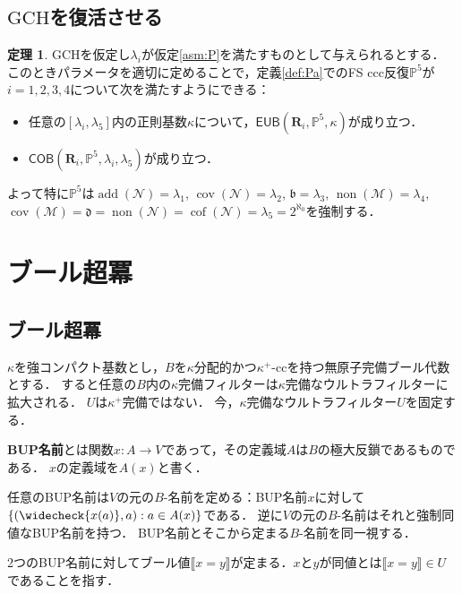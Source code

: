 \documentclass[uplatex,dvipdfmx]{jsarticle}
\newcommand{\non}{\operatorname{non}}
\newcommand{\cov}{\operatorname{cov}}
\newcommand{\add}{\operatorname{add}}
\newcommand{\cof}{\operatorname{cof}}
\newcommand{\GCH}{\mathrm{GCH}}
\newcommand{\EUB}{\mathsf{EUB}}
\newcommand{\COB}{\mathsf{COB}}
\newcommand{\relR}{\mathbf{R}}
\newcommand{\Pa}{\mathbb{P}^5}
\newcommand{\covnull}{\cov(\mathcal N)}
\newcommand{\cofnull}{\cof(\mathcal N)}
\newcommand{\addnull}{\add(\mathcal N)}
\newcommand{\nonnull}{\non(\mathcal N)}
\newcommand{\covmeager}{\cov(\mathcal M)}
\newcommand{\nonmeager}{\non(\mathcal M)}
\newcommand{\truth}[1]{\llbracket #1 \rrbracket}
\renewcommand\emptyset{\varnothing}
\theoremstyle{definition}
\newtheorem{thm}{定理}
\begin{document}
		
	\subsection{$\GCH$を復活させる}
	
	
	\begin{thm}\label{thm:Pa}
		GCHを仮定し$\lambda_i$が仮定\ref{asm:P}を満たすものとして与えられるとする．
		このときパラメータを適切に定めることで，定義\ref{def:Pa}でのFS ccc反復$\Pa$が$i=1,2,3,4$について次を満たすようにできる：
		\begin{itemize} 
			\item  任意の$[\lambda_i,\lambda_5]$内の正則基数$\kappa$について，$\EUB(\relR_i, \Pa,\kappa)$が成り立つ．
			\item $\COB(\relR_i, \Pa,\lambda_i,\lambda_5)$が成り立つ．
		\end{itemize}
		よって特に$\Pa$は$\addnull=\lambda_1$, $\covnull=\lambda_2$, 
		$\mathfrak{b}=\lambda_3$, $\nonmeager=\lambda_4$,
		$\covmeager=\mathfrak{d}=\nonnull=\cofnull=\lambda_5=2^{\aleph_0}$を強制する．
	\end{thm}
	
	\section{ブール超冪}
	
	\subsection{ブール超冪}
	
	$\kappa$を強コンパクト基数とし，$B$を$\kappa$分配的かつ$\kappa^+$-ccを持つ無原子完備ブール代数とする．
	すると任意の$B$内の$\kappa$完備フィルターは$\kappa$完備なウルトラフィルターに拡大される．
	$U$は$\kappa^+$完備ではない．
	今，$\kappa$完備なウルトラフィルター$U$を固定する．
	
	\textbf{BUP名前}とは関数$x \colon A \to V$であって，その定義域$A$は$B$の極大反鎖であるものである．
	$x$の定義域を$A(x)$と書く．
	
	任意のBUP名前は$V$の元の$B$-名前を定める：BUP名前$x$に対して$\{ (\widecheck{x(a)}, a) : a \in A(x) \}$である．
	逆に$V$の元の$B$-名前はそれと強制同値なBUP名前を持つ．
	BUP名前とそこから定まる$B$-名前を同一視する．
	
	2つのBUP名前に対してブール値$\truth{x=y}$が定まる．$x$と$y$が同値とは$\truth{x=y} \in U$であることを指す．
	
\end{document}
